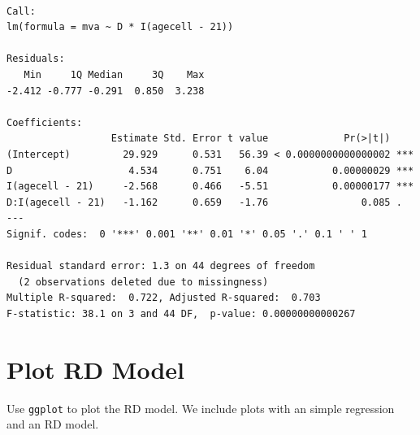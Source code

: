 \documentclass[]{book}
\newenvironment{Shaded}{\begin{snugshade}}{\end{snugshade}}
\newcommand{\DataTypeTok}[1]{\textcolor[rgb]{0.13,0.29,0.53}{#1}}
\newcommand{\DecValTok}[1]{\textcolor[rgb]{0.00,0.00,0.81}{#1}}
\newcommand{\KeywordTok}[1]{\textcolor[rgb]{0.13,0.29,0.53}{\textbf{#1}}}
\newcommand{\NormalTok}[1]{#1}
\newcommand{\OperatorTok}[1]{\textcolor[rgb]{0.81,0.36,0.00}{\textbf{#1}}}
\newcommand{\StringTok}[1]{\textcolor[rgb]{0.31,0.60,0.02}{#1}}
\begin{document}
\begin{Shaded}
\end{Shaded}

\begin{verbatim}

Call:
lm(formula = mva ~ D * I(agecell - 21))

Residuals:
   Min     1Q Median     3Q    Max 
-2.412 -0.777 -0.291  0.850  3.238 

Coefficients:
                  Estimate Std. Error t value             Pr(>|t|)    
(Intercept)         29.929      0.531   56.39 < 0.0000000000000002 ***
D                    4.534      0.751    6.04           0.00000029 ***
I(agecell - 21)     -2.568      0.466   -5.51           0.00000177 ***
D:I(agecell - 21)   -1.162      0.659   -1.76                0.085 .  
---
Signif. codes:  0 '***' 0.001 '**' 0.01 '*' 0.05 '.' 0.1 ' ' 1

Residual standard error: 1.3 on 44 degrees of freedom
  (2 observations deleted due to missingness)
Multiple R-squared:  0.722, Adjusted R-squared:  0.703 
F-statistic: 38.1 on 3 and 44 DF,  p-value: 0.00000000000267
\end{verbatim}

\hypertarget{plot-rd-model}{%
\section{Plot RD Model}\label{plot-rd-model}}

Use \texttt{ggplot} to plot the RD model. We include plots with an simple regression and an RD model.
\end{document}
